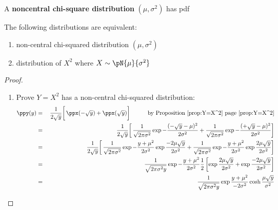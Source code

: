 \begin{definition}
A {\bf noncentral chi-square distribution} $(\mu,\sigma^2)$
has pdf
\end{definition}

\begin{theorem}
The following distributions are equivalent:
\begin{enumerate}
  \item non-central chi-squared distribution $(\mu,\sigma^2)$
  \item distribution of $X^2$ where $X\sim\pN{\mu}{\sigma^2}$
\end{enumerate}

\end{theorem}
\begin{proof}
\begin{enumerate}
\item Prove $Y=X^2$ has a non-central chi-squared distribution:
\begin{eqnarray*}
  \ppy(y)
    &=& \left.\left.\frac{1}{2\sqrt{y}}\right[
        \ppx(-\sqrt{y}) + \ppx( \sqrt{y}) \right]
        \hspace{1cm}\mbox{by Proposition~\ref{prop:Y=X^2} page~\pageref{prop:Y=X^2}}
  \\&=& \left.\left.\frac{1}{2\sqrt{y}}\right[
        \frac{1}{\sqrt{2\pi\sigma^2}} \exp{-\frac{(-\sqrt{y}-\mu)^2}{2\sigma^2}}+
        \frac{1}{\sqrt{2\pi\sigma^2}} \exp{-\frac{(+\sqrt{y}-\mu)^2}{2\sigma^2}}
        \right]
  \\&=& \left.\left.\frac{1}{2\sqrt{y}}\right[
        \frac{1}{\sqrt{2\pi\sigma^2}} \exp{-\frac{y+\mu^2 }{2\sigma^2}} \exp{\frac{-2\mu\sqrt{y}}{2\sigma^2}}+
        \frac{1}{\sqrt{2\pi\sigma^2}} \exp{-\frac{y+\mu^2 }{2\sigma^2}} \exp{\frac{ 2\mu\sqrt{y}}{2\sigma^2}}
        \right]
  \\&=& \frac{1}{\sqrt{2\pi\sigma^2y}} \exp{-\frac{y+\mu^2 }{2\sigma^2}} 
        \frac{1}{2}
        \left[ 
          \exp{\frac{ 2\mu\sqrt{y}}{2\sigma^2}} +
          \exp{\frac{-2\mu\sqrt{y}}{2\sigma^2}}
        \right]
  \\&=& \frac{1}{\sqrt{2\pi\sigma^2y}} \exp{\frac{y+\mu^2 }{-2\sigma^2}} 
          \cosh{\frac{ \mu\sqrt{y}}{\sigma^2}}
\end{eqnarray*}
\end{enumerate}
\end{proof}

